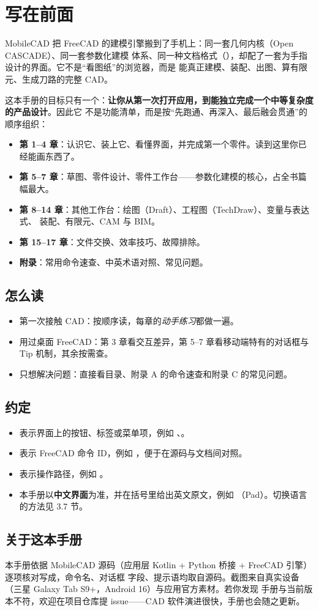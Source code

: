 \chapter*{写在前面}

MobileCAD 把 FreeCAD 的建模引擎搬到了手机上：同一套几何内核（Open CASCADE）、同一套参数化建模
体系、同一种文档格式（），却配了一套为手指设计的界面。它不是“看图纸”的浏览器，而是
能真正建模、装配、出图、算有限元、生成刀路的完整 CAD。

这本手册的目标只有一个：\textbf{让你从第一次打开应用，到能独立完成一个中等复杂度的产品设计}。因此它
不是功能清单，而是按“先跑通、再深入、最后融会贯通”的顺序组织：

\begin{itemize}
  \item \textbf{第 1--4 章}：认识它、装上它、看懂界面，并完成第一个零件。读到这里你已经能画东西了。
  \item \textbf{第 5--7 章}：草图、零件设计、零件工作台——参数化建模的核心，占全书篇幅最大。
  \item \textbf{第 8--14 章}：其他工作台：绘图（Draft）、工程图（TechDraw）、变量与表达式、
        装配、有限元、CAM 与 BIM。
  \item \textbf{第 15--17 章}：文件交换、效率技巧、故障排除。
  \item \textbf{附录}：常用命令速查、中英术语对照、常见问题。
\end{itemize}

\section*{怎么读}
\begin{itemize}
  \item 第一次接触 CAD：按顺序读，每章的\emph{动手练习}都做一遍。
  \item 用过桌面 FreeCAD：第 3 章看交互差异，第 5--7 章看移动端特有的对话框与 Tip 机制，其余按需查。
  \item 只想解决问题：直接看目录、附录 A 的命令速查和附录 C 的常见问题。
\end{itemize}

\section*{约定}
\begin{itemize}
  \item {}表示界面上的按钮、标签或菜单项，例如 、。
  \item {}表示 FreeCAD 命令 ID，例如 ，便于在源码与文档间对照。
  \item {}表示操作路径，例如 。
  \item 本手册以\textbf{中文界面}为准，并在括号里给出英文原文，例如 （Pad）。切换语言的方法见 3.7 节。
\end{itemize}

\section*{关于这本手册}
本手册依据 MobileCAD 源码（应用层 Kotlin + Python 桥接 + FreeCAD 引擎）逐项核对写成，命令名、对话框
字段、提示语均取自源码。截图来自真实设备（三星 Galaxy Tab S9+，Android 16）与应用官方素材。若你发现
手册与当前版本不符，欢迎在项目仓库提 issue——CAD 软件演进很快，手册也会随之更新。

